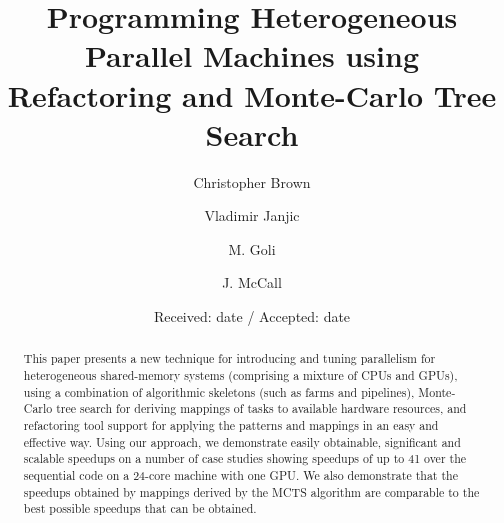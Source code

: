 \documentclass[smallextended]{svjour3}
\begin{document}
	\title{Programming Heterogeneous Parallel Machines using Refactoring and Monte-Carlo Tree Search}


\author{Christopher Brown         \and
	Vladimir Janjic  \and 
	M. Goli \and
	J. McCall \and
}



\date{Received: date / Accepted: date}


\maketitle

\begin{abstract}
This paper presents a new technique for 
introducing and tuning parallelism for heterogeneous shared-memory systems (comprising a
mixture of CPUs and GPUs), using a combination of algorithmic skeletons (such as farms and pipelines),
Monte-Carlo tree search for deriving mappings of tasks to available hardware resources, and refactoring
tool support for applying the patterns and mappings in an easy and effective way.
Using our approach, we demonstrate easily obtainable, significant and scalable speedups on a number of case studies showing speedups of up to 41 over the sequential code on a 24-core machine
with one GPU. We also demonstrate that 
the speedups obtained by mappings derived by the MCTS algorithm are comparable to
the best possible speedups that can be obtained. %
\end{abstract}
\end{document}
